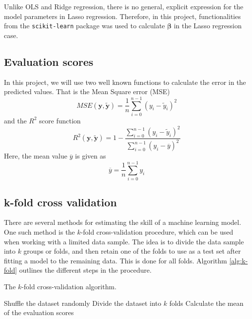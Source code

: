 Unlike OLS and Ridge regression, there is no general, explicit expression for the model parameters in Lasso regression. Therefore, in this project, functionalities from the \texttt{scikit-learn} package was used to calculate $\boldsymbol{\beta}$  in the Lasso regression case.  

\subsection{Evaluation scores}
In this project, we will use two well known functions to calculate the error in the predicted values. That is the Mean Square error (MSE)
\begin{equation*}
	MSE(\boldsymbol{y},\boldsymbol{\tilde{y}}) = \frac{1}{n} \sum_{i=0}^{n-1}\left(y_i-\tilde{y}_i\right)^2
\end{equation*}
and the $R^2$ score function
\begin{equation*}
	R^2(\boldsymbol{y},\boldsymbol{\tilde{y}}) = 1- \frac{\sum_{i=0}^{n-1}\left(y_i-\tilde{y}_i\right)^2}{\sum_{i=0}^{n-1}\left(y_i-\overline{y}\right)^2}
\end{equation*}
Here, the mean value $\overline{y}$ is given as
\begin{equation*}
	\overline{y}=\frac{1}{n}\sum_{i=0}^{n-1}y_i
\end{equation*}

\subsection{k-fold cross validation}
There are several methods for estimating the skill of a machine learning model. One such method is the $k$-fold cross-validation procedure, which can be used when working with a limited data sample. The idea is to divide the data sample into $k$ groups or folds, and then retain one of the folds to use as a test set after fitting a model to the remaining data. This is done for all folds. Algorithm \ref{alg:k-fold} outlines the different steps in the procedure. 

\begin{algorithm}[htbp]\caption{The $k$-fold cross-validation algorithm.}\label{alg:k-fold}
	\SetAlgoLined
	\BlankLine
	\BlankLine
	Shuffle the dataset randomly\;
	Divide the dataset into $k$ folds\;
	Calculate the mean of the evaluation scores\;	
	\BlankLine
	\BlankLine
\end{algorithm}


